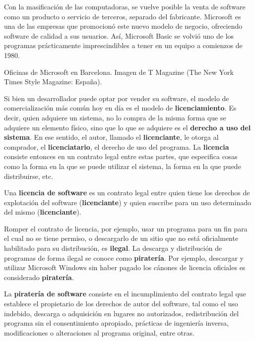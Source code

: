 Con la masificación de las computadoras, se vuelve posible la venta de software
como un producto o servicio de terceros, separado del fabricante. Microsoft
es una de las empresas que promocionó este nuevo modelo de negocio, ofreciendo
software de calidad a sus usuarios. Así, Microsoft Basic se volvió uno de los
programas prácticamente imprescindibles a tener en un equipo a comienzos de 1980.

{Oficinas de Microsoft en Barcelona.}
{Imagen de T Magazine (The New York Times Style Magazine: España).}

Si bien un desarrollador puede optar por vender su software, el modelo de
comercialización más común hoy en día es el modelo de \textbf{licenciamiento}.
Es decir, quien adquiere un sistema, no lo compra de la misma forma que se
adquiere un elemento físico, sino que lo que se adquiere es el \textbf{derecho a
uso del sistema}. En ese sentido, el autor, llamado el \textbf{licenciante}, le
otorga al comprador, el \textbf{licenciatario}, el derecho de uso del programa.
La \textbf{licencia} consiste entonces en un contrato legal entre estas partes,
que especifica cosas como la forma en la que se puede utilizar el sistema, la
forma en la que puede distribuirse, etc.

\begin{definition}
    Una \textbf{licencia de software} es un contrato legal entre quien tiene los
    derechos de explotación del software (\textbf{licenciante}) y quien suscribe
    para un uso determinado del mismo (\textbf{licenciante}).
\end{definition}

Romper el contrato de licencia, por ejemplo, usar un programa para un fin para
el cual no se tiene permiso, o descargarlo de un sitio que no está oficialmente
habilitado para su distribución, es \textbf{ilegal}. La descarga y distribución
de programas de forma ilegal se conoce como \textbf{piratería}. Por ejemplo,
descargar y utilizar Microsoft Windows sin haber pagado los cánones de licencia
oficiales es considerado \textbf{piratería}.

\begin{definition}
    La \textbf{piratería de software} consiste en el incumplimiento del contrato
    legal que establece el propietario de los derechos de autor del software,
    tal como el uso indebido, descarga o adquisición en lugares no autorizados,
    redistribución del programa sin el consentimiento apropiado, prácticas de
    ingeniería inversa, modificaciones o alteraciones al programa original,
    entre otras.
\end{definition}

